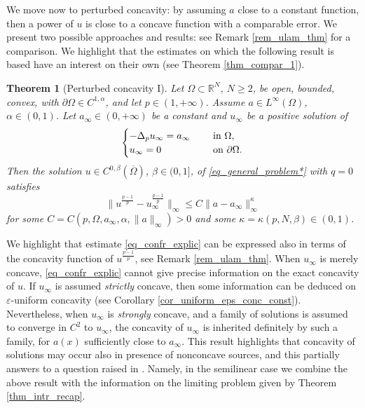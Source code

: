 \documentclass[11pt, reqno]{amsart}
\newtheorem{theorem}[lemma]{Theorem}
\theoremstyle{definition}
\numberwithin{equation}{section}
\newcommand{\R}{\mathbb{R}}
\def\eps{\varepsilon}
\def\norm#1{\|#1\|}
\begin{document}
We move now to perturbed concavity: by assuming $a$ close to a constant function, then a power of $u$ is close to a concave function with a comparable error.
We present two possible approaches and results: see Remark \ref{rem_ulam_thm} for a comparison. 
We highlight that the estimates on which the following result is based have an interest on their own (see Theorem \ref{thm_compar_1}).

\begin{theorem}[Perturbed concavity I]
\label{thm_approx_concav_compar}
Let $\Omega \subset \R^N$, $N\geq 2$, be open, bounded, convex, with $\partial \Omega \in C^{1,\alpha}$, and let $p\in (1,+\infty)$.
Assume $a \in L^{\infty}(\Omega)$, $\alpha \in (0,1)$. 
Let $a_{\infty} \in (0,+\infty)$ be a constant and $u_{\infty}$ be a positive solution of
$$\begin{cases}
-\Delta_p u_{\infty} = a_{\infty} & \quad \hbox{ in $\Omega$},\\ 
u_{\infty} =0 & \quad \hbox{ on $\partial \Omega$}.
\end{cases}$$
Then the solution $u \in C^{0,\beta}(\overline{\Omega})$, $\beta \in (0,1]$, of \eqref{eq_general_problem*} with $q=0$ satisfies
\begin{equation}\label{eq_confr_explic}
\norm{u^{\frac{p-1}{p}}-u_{\infty}^{\frac{p-1}{p}}}_{\infty} \leq
C \norm{a -a_{\infty}}_{\infty}^{\kappa }
\end{equation}
 for some $C=C(p, \Omega, a_{\infty}, \alpha, \norm{a}_{\infty})>0$ and some $\kappa =\kappa(p, N, \beta) \in (0,1)$. 
\end{theorem}

We highlight that estimate \eqref{eq_confr_explic} can be expressed also in terms of the concavity function of $u^{\frac{p-1}{p}}$, see Remark \ref{rem_ulam_thm}.
When $u_{\infty}$ is merely concave, \eqref{eq_confr_explic} cannot give precise information on the exact concavity of $u$. If $u_{\infty}$ is assumed \emph{strictly} concave, then some information can be deduced on $\eps$-uniform concavity (see Corollary \ref{cor_uniform_eps_conc_const}). 
Nevertheless, when $u_{\infty}$ is \emph{strongly} concave, and a family of solutions is assumed to converge in $C^2$ to $u_{\infty}$, the concavity of $u_{\infty}$ is inherited definitely by such a family, for $a(x)$ sufficiently close to $a_{\infty}$. 
This result highlights that concavity of solutions may occur also in presence of nonconcave sources, and this partially answers to a question raised in \cite[Theorem 16 in Section 7]{Ken84}.
Namely, in the semilinear case we combine the above result with the information on the limiting problem given by Theorem \ref{thm_intr_recap}.
\end{document}
